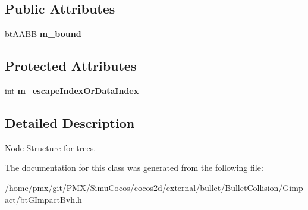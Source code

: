 \subsection*{Public Attributes}
\begin{DoxyCompactItemize}
\item 
\mbox{\label{classGIM__BVH__TREE__NODE_a28198387573401c0d86c036aec105b81}} 
bt\+A\+A\+BB {\bfseries m\+\_\+bound}
\end{DoxyCompactItemize}
\subsection*{Protected Attributes}
\begin{DoxyCompactItemize}
\item 
\mbox{\label{classGIM__BVH__TREE__NODE_ac56b386b685e01f9ae8ccd7d497d3264}} 
int {\bfseries m\+\_\+escape\+Index\+Or\+Data\+Index}
\end{DoxyCompactItemize}


\subsection{Detailed Description}
\hyperlink{classNode}{Node} Structure for trees. 

The documentation for this class was generated from the following file\+:\begin{DoxyCompactItemize}
\item 
/home/pmx/git/\+P\+M\+X/\+Simu\+Cocos/cocos2d/external/bullet/\+Bullet\+Collision/\+Gimpact/bt\+G\+Impact\+Bvh.\+h\end{DoxyCompactItemize}
